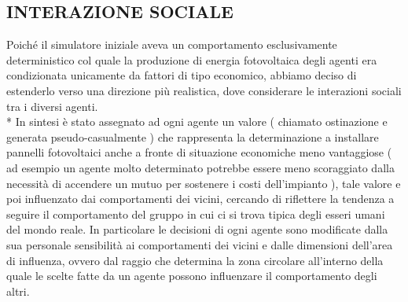 \documentclass[12pt,a4paper,openright,twoside]{report}
\begin{document}
\subsection{INTERAZIONE SOCIALE}
Poiché il simulatore iniziale aveva un comportamento esclusivamente deterministico col quale la produzione di energia fotovoltaica degli agenti era condizionata unicamente da fattori di tipo economico, abbiamo deciso di estenderlo verso una direzione più realistica, dove considerare le interazioni sociali tra i diversi agenti. \\*
In sintesi è stato assegnato ad ogni agente un valore ( chiamato ostinazione e generata pseudo-casualmente ) che rappresenta la determinazione a installare pannelli fotovoltaici anche a fronte di situazione economiche meno vantaggiose ( ad esempio un agente molto determinato potrebbe essere meno scoraggiato dalla necessità di accendere un mutuo per sostenere  i costi dell'impianto ), tale valore e poi influenzato dai comportamenti dei vicini, cercando di riflettere la tendenza a seguire il comportamento del gruppo in cui ci si trova tipica degli esseri umani del mondo reale. In particolare le decisioni di ogni agente sono modificate dalla sua personale sensibilità ai comportamenti dei vicini e dalle dimensioni dell'area di influenza, ovvero dal raggio che determina la zona circolare all'interno della quale le scelte fatte da un agente possono influenzare il comportamento degli altri.
\end{document}
